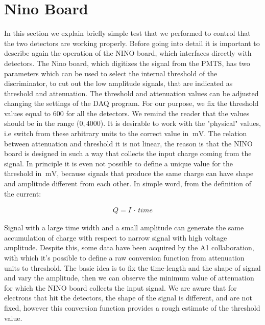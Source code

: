 \section{Nino Board}
In this section we explain briefly simple test that we performed to control that the two detectors are working properly. Before going into detail it is important to describe again the operation of the NINO board, which interfaces directly with detectors.
The Nino board, which digitizes the signal from the PMTS, has two parameters which can be used to select the internal threshold of the discriminator, to cut out the low amplitude signals, that are indicated as threshold and attenuation. The threshold and attenuation values can be adjusted changing the settings of the DAQ program.
For our purpose, we fix the threshold values equal to $600$ for all the detectors. We remind the reader that the values should be in the range ($0,4000$). 
It is desirable to work with the "physical" values, i.e switch from these arbitrary units to the correct value in $\SI{}{\milli \volt}$. The relation between attenuation and threshold it is not linear, the reason is that the NINO board is designed in such a way that collects the input charge coming from the signal. In principle it is even not possible to define a unique value for the threshold in $\SI{}{\milli \volt}$, because signals that produce the same charge can have shape and amplitude different from each other. In simple word, from the definition of the current:

\begin{align}
Q = I \, \cdot \, time
\end{align}

Signal with a large time width and a small amplitude can generate the same accumulation of charge with respect to narrow signal with high voltage amplitude. Despite this, some data have been acquired by the A1 collaboration, with which it's possible to define a raw conversion function from attenuation units to threshold. The basic idea is to fix the time-length and the shape of signal and vary the amplitude, then we can observe the minimum value of attenuation for which the NINO board collects the input signal. We are aware that for electrons that hit the detectors, the shape of the signal is different, and are not fixed, however this conversion function provides a rough estimate of the threshold value.

